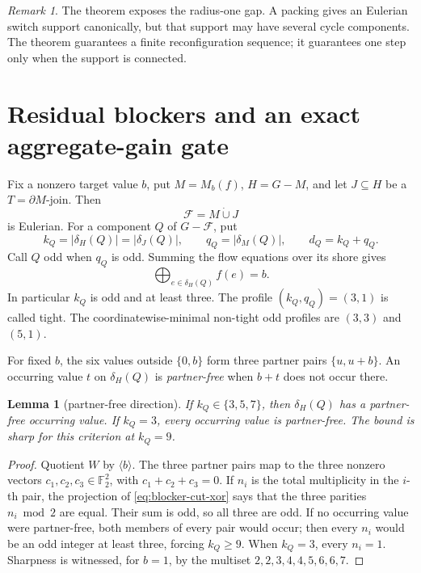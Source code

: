 \documentclass[11pt]{article}
\newtheorem{lemma}[theorem]{Lemma}
\theoremstyle{definition}
\theoremstyle{remark}
\newtheorem{remark}[theorem]{Remark}
\newcommand{\F}{\mathbb F}
\newcommand{\bd}{\partial}
\numberwithin{equation}{section}
\begin{document}
\begin{remark}
The theorem exposes the radius-one gap.  A packing gives an Eulerian
switch support canonically, but that support may have several cycle
components.  The theorem guarantees a finite reconfiguration sequence;
it guarantees one step only when the support is connected.
\end{remark}

\section{Residual blockers and an exact aggregate-gain gate}

Fix a nonzero target value \(b\), put \(M=M_b(f)\), \(H=G-M\), and let
\(J\subseteq H\) be a \(T=\bd M\)-join.  Then
\[
                         \mathcal F=M\mathbin{\dot\cup}J
\]
is Eulerian.  For a component \(Q\) of \(G-\mathcal F\), put
\[
 k_Q=|\delta_H(Q)|=|\delta_J(Q)|,\qquad
 q_Q=|\delta_M(Q)|,\qquad d_Q=k_Q+q_Q.
\]
Call \(Q\) odd when \(q_Q\) is odd.  Summing the flow equations over its
shore gives
\begin{equation}
                 \bigoplus_{e\in\delta_H(Q)}f(e)=b.          \label{eq:blocker-cut-xor}
\end{equation}
In particular \(k_Q\) is odd and at least three.  The profile
\((k_Q,q_Q)=(3,1)\) is called tight.  The coordinatewise-minimal non-tight
odd profiles are \((3,3)\) and \((5,1)\).

For fixed \(b\), the six values outside \(\{0,b\}\) form three partner
pairs \(\{u,u+b\}\).  An occurring value \(t\) on
\(\delta_H(Q)\) is \emph{partner-free} when \(b+t\) does not occur there.

\begin{lemma}[partner-free direction]\label{lem:partner-free}
If \(k_Q\in\{3,5,7\}\), then \(\delta_H(Q)\) has a partner-free occurring
value.  If \(k_Q=3\), every occurring value is partner-free.  The bound is
sharp for this criterion at \(k_Q=9\).
\end{lemma}

\begin{proof}
Quotient \(W\) by \(\langle b\rangle\).  The three partner pairs map to
the three nonzero vectors \(c_1,c_2,c_3\in\F_2^2\), with
\(c_1+c_2+c_3=0\).  If \(n_i\) is the total multiplicity in the \(i\)-th
pair, the projection of \eqref{eq:blocker-cut-xor} says that the three
parities \(n_i\bmod2\) are equal.  Their sum is odd, so all three are odd.
If no occurring value were partner-free, both members of every pair would
occur; then every \(n_i\) would be an odd integer at least three, forcing
\(k_Q\ge9\).  When \(k_Q=3\), every \(n_i=1\).  Sharpness is witnessed,
for \(b=1\), by the multiset \(2,2,3,4,4,5,6,6,7\).
\end{proof}
\end{document}
